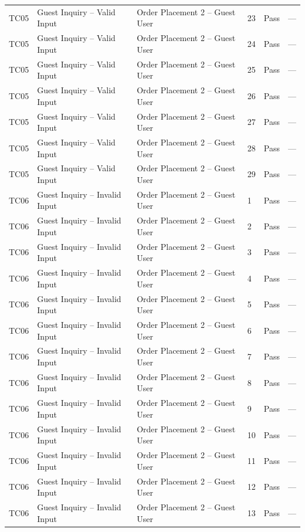 {\begin{longtable}{@{}p{1.2cm} p{4.2cm} p{4.4cm} p{0.8cm} p{0.9cm} p{1.6cm}@{}}
  TC05 & Guest Inquiry -- Valid Input & Order Placement 2 -- Guest User & 23 & Pass & --- \\
  TC05 & Guest Inquiry -- Valid Input & Order Placement 2 -- Guest User & 24 & Pass & --- \\
  TC05 & Guest Inquiry -- Valid Input & Order Placement 2 -- Guest User & 25 & Pass & --- \\
  TC05 & Guest Inquiry -- Valid Input & Order Placement 2 -- Guest User & 26 & Pass & --- \\
  TC05 & Guest Inquiry -- Valid Input & Order Placement 2 -- Guest User & 27 & Pass & --- \\
  TC05 & Guest Inquiry -- Valid Input & Order Placement 2 -- Guest User & 28 & Pass & --- \\
  TC05 & Guest Inquiry -- Valid Input & Order Placement 2 -- Guest User & 29 & Pass & --- \\
  \midrule
  TC06 & Guest Inquiry -- Invalid Input & Order Placement 2 -- Guest User & 1 & Pass & --- \\
  TC06 & Guest Inquiry -- Invalid Input & Order Placement 2 -- Guest User & 2 & Pass & --- \\
  TC06 & Guest Inquiry -- Invalid Input & Order Placement 2 -- Guest User & 3 & Pass & --- \\
  TC06 & Guest Inquiry -- Invalid Input & Order Placement 2 -- Guest User & 4 & Pass & --- \\
  TC06 & Guest Inquiry -- Invalid Input & Order Placement 2 -- Guest User & 5 & Pass & --- \\
  TC06 & Guest Inquiry -- Invalid Input & Order Placement 2 -- Guest User & 6 & Pass & --- \\
  TC06 & Guest Inquiry -- Invalid Input & Order Placement 2 -- Guest User & 7 & Pass & --- \\
  TC06 & Guest Inquiry -- Invalid Input & Order Placement 2 -- Guest User & 8 & Pass & --- \\
  TC06 & Guest Inquiry -- Invalid Input & Order Placement 2 -- Guest User & 9 & Pass & --- \\
  TC06 & Guest Inquiry -- Invalid Input & Order Placement 2 -- Guest User & 10 & Pass & --- \\
  TC06 & Guest Inquiry -- Invalid Input & Order Placement 2 -- Guest User & 11 & Pass & --- \\
  TC06 & Guest Inquiry -- Invalid Input & Order Placement 2 -- Guest User & 12 & Pass & --- \\
  TC06 & Guest Inquiry -- Invalid Input & Order Placement 2 -- Guest User & 13 & Pass & --- \\

\end{longtable}}
